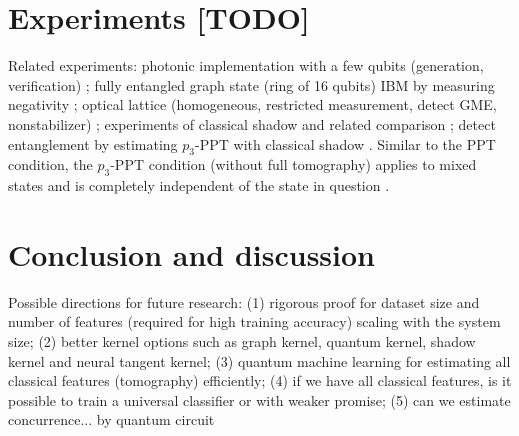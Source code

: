 \documentclass[
aps,
pra,
twocolumn,
floatfix,
]{revtex4-2}
\theoremstyle{plain}
\theoremstyle{definition}
\newcommand{\dm}{\rho}
\begin{document}
\section{Experiments [TODO]}\label{sec:experiments}
Related experiments: photonic implementation with a few qubits (generation, verification) \cite{luEntanglementStructureEntanglement2018};
fully entangled graph state (ring of 16 qubits) IBM by measuring negativity \cite{wang16qubitIBMUniversal2018};
optical lattice (homogeneous, restricted measurement, detect GME, nonstabilizer) \cite{zhouSchemeCreateVerify2022};
experiments of classical shadow and related comparison \cite{zhangExperimentalQuantumState2021};
detect entanglement by estimating $p_3$-PPT with classical shadow \cite{elbenMixedstateEntanglementLocal2020}.
Similar to the PPT condition, the $p_3$-PPT condition (without full tomography) applies to mixed states and is completely independent of the state in question \cite{elbenMixedstateEntanglementLocal2020}. 

\section{Conclusion and discussion}
Possible directions for future research:
(1) rigorous proof for dataset size and number of features (required for high training accuracy) scaling with the system size;
(2) better kernel options such as graph kernel, quantum kernel, shadow kernel and neural tangent kernel;
(3) quantum machine learning for estimating all classical features (tomography) efficiently;
(4) if we have all classical features, is it possible to train a universal classifier or with weaker promise;
(5) can we estimate concurrence... by quantum circuit


\begin{acknowledgments}
\end{acknowledgments}



%


\onecolumngrid
\appendix



\end{document}
